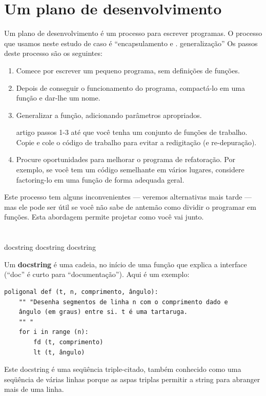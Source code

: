 \documentclass[10pt]{book}
\begin{document}
\begin{exercise}
\section{Um plano de desenvolvimento}

Um plano de desenvolvimento {\bf} é um processo para escrever programas.
O processo que usamos
neste estudo de caso é ``encapsulamento e
. generalização'' Os passos deste processo são os seguintes:

\begin{enumerate}

\item Comece por escrever um pequeno programa, sem definições de funções.

\item Depois de conseguir o funcionamento do programa, compactá-lo em uma função
e dar-lhe um nome.

\item Generalizar a função, adicionando parâmetros apropriados.

\Repita artigo passos 1-3 até que você tenha um conjunto de funções de trabalho.
Copie e cole o código de trabalho para evitar a redigitação (e re-depuração).

\item Procure oportunidades para melhorar o programa de refatoração.
Por exemplo, se você tem um código semelhante em vários lugares, considere
factoring-lo em uma função de forma adequada geral.

\end{enumerate}

Este processo tem alguns inconvenientes --- veremos alternativas mais tarde --- mas
ele pode ser útil se você não sabe de antemão como dividir o
programar em funções. Esta abordagem permite projetar como você vai
junto.


\section{} docstring
\label{} docstring
\index{} docstring

Um {\bf docstring} é uma cadeia, no início de uma função que
explica a interface (``doc'' é curto para ``documentação''). Aqui
é um exemplo:

\begin{verbatim}
poligonal def (t, n, comprimento, ângulo):
    "" "Desenha segmentos de linha n com o comprimento dado e
    ângulo (em graus) entre si. t é uma tartaruga.
    "" "    
    for i in range (n):
        fd (t, comprimento)
        lt (t, ângulo)
\end{verbatim}
%
Este docstring é uma seqüência triple-citado, também conhecido
como uma seqüência de várias linhas porque as aspas triplas permitir a string
para abranger mais de uma linha.


\end{exercise}
\end{document}
